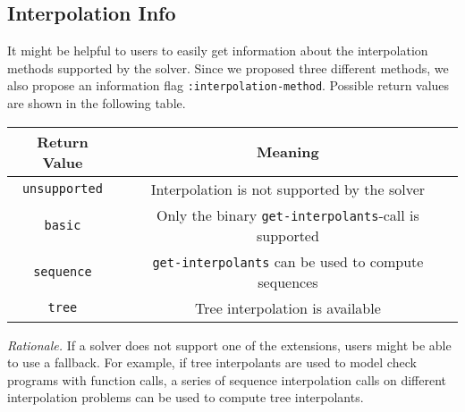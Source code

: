 \documentclass[a4paper,12pt]{article}
\begin{document}
\subsection*{Interpolation Info}
It might be helpful to users to easily get information about the interpolation
methods supported by the solver.  Since we proposed three different methods,
we also propose an information flag \texttt{:interpolation-method}.  Possible
return values are shown in the following table.\\
\begin{tabular}{c|c}
Return Value & Meaning\\\hline\hline
\texttt{unsupported} & Interpolation is not supported by the solver\\\hline
\texttt{basic} & Only the binary \texttt{get-interpolants}-call is
supported\\\hline
\texttt{sequence} & \texttt{get-interpolants} can be used to compute
sequences\\\hline
\texttt{tree} & Tree interpolation is available
\end{tabular}

\emph{Rationale.} If a solver does not support one of the extensions, users
might be able to use a fallback.  For example, if tree interpolants are used
to model check programs with function calls, a series of sequence
interpolation calls on different interpolation problems can be used to compute
tree interpolants.



\end{document}
